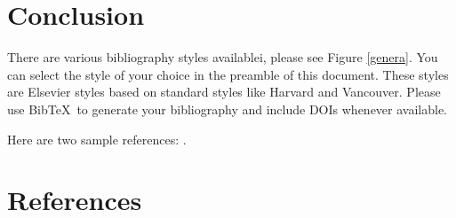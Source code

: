 \documentclass[review]{elsarticle}
\begin{document}
\section{Conclusion}

There are various bibliography styles availablei, please see Figure \ref{genera}. You can select the style of your choice in the preamble of this document. These styles are Elsevier styles based on standard styles like Harvard and Vancouver. Please use Bib\TeX\ to generate your bibliography and include DOIs whenever available.

Here are two sample references: \citep{Feynman1963118,Dirac1953888}.

\section*{References}


\end{document}
